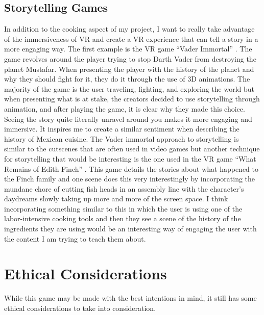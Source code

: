 \documentclass[11pt,twocolumn]{article}
\begin{document}
\subsection{Storytelling Games}
In addition to the cooking aspect of my project, I want to really take advantage of the immersiveness of VR and create a VR experience that can tell a story in a more engaging way. The first example is the VR game “Vader Immortal” \cite{vadarimmortal2019ep1}. The game revolves around the player trying to stop Darth Vader from destroying the planet Mustafar. When presenting the player with the history of the planet and why they should fight for it, they do it through the use of 3D animations. The majority of the game is the user traveling, fighting, and exploring the world but when presenting what is at stake, the creators decided to use storytelling through animation, and after playing the game, it is clear why they made this choice. Seeing the story quite literally unravel around you makes it more engaging and immersive. It inspires me to create a similar sentiment when describing the history of Mexican cuisine. The Vader immortal approach to storytelling is similar to the cutscenes that are often used in video games but another technique for storytelling that would be interesting is the one used in the VR game “What Remains of Edith Finch” \cite{finch2019}. This game details the stories about what happened to the Finch family and one scene does this very interestingly by incorporating the mundane chore of cutting fish heads in an assembly line with the character’s daydreams slowly taking up more and more of the screen space. I think incorporating something similar to this in which the user is using one of the labor-intensive cooking tools and then they see a scene of the history of the ingredients they are using would be an interesting way of engaging the user with the content I am trying to teach them about. 

\section{Ethical Considerations}
While this game may be made with the best intentions in mind, it still has some ethical considerations to take into consideration. 
\end{document}

